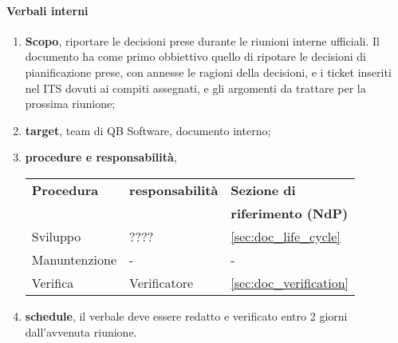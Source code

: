         \paragraph{Verbali interni}
            \begin{enumerate}
                \item \textbf{Scopo}, riportare le decisioni prese durante le riunioni interne ufficiali. Il documento ha come primo obbiettivo quello di ripotare le decisioni di pianificazione prese, con annesse le ragioni della decisioni, e i ticket inseriti nel ITS dovuti ai compiti assegnati, e gli argomenti da trattare per la prossima riunione;
                \item \textbf{target}, team di QB Software, documento interno;
                \item \textbf{procedure e responsabilità},
                    \newline
                    \begin{tabularx}{0.93\textwidth}{|X|X|X|}
                        \hline
                        \textbf{Procedura} & \textbf{responsabilità} & \textbf{Sezione di} \\
                        & & \textbf{riferimento (NdP)} \\
                        \hline
                        Sviluppo & ???? &  \ref{sec:doc_life_cycle}
                        \\\hline
                        Manuntenzione & - & -
                        \\\hline
                        Verifica & Verificatore & \ref{sec:doc_verification}
                        \\\hline
                    \end{tabularx}
                \item \textbf{schedule}, il verbale deve essere redatto e verificato entro 2 giorni dall'avvenuta riunione.
            \end{enumerate} 

